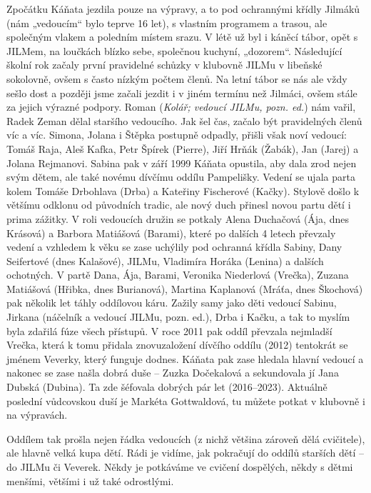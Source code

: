 Zpočátku Káňata jezdila pouze na výpravy, a to pod ochrannými křídly
Jilmáků (nám „vedoucím`` bylo teprve 16 let), s vlastním programem a
trasou, ale společným vlakem a poledním místem srazu. V létě už byl i
káněcí tábor, opět s JILMem, na loučkách blízko sebe, společnou kuchyní,
„dozorem``. Následující školní rok začaly první pravidelné schůzky v
klubovně JILMu v libeňské sokolovně, ovšem s často nízkým počtem členů.
Na letní tábor se nás ale vždy sešlo dost a později jsme začali jezdit i
v jiném termínu než Jilmáci, ovšem stále za jejich výrazné podpory.
Roman (\emph{Kolář; vedoucí JILMu, pozn. ed.}) nám vařil, Radek Zeman
dělal staršího vedoucího. Jak šel čas, začalo být pravidelných členů víc
a víc. Simona, Jolana i Štěpka postupně odpadly, přišli však noví
vedoucí: Tomáš Raja, Aleš Kafka, Petr Špírek (Pierre), Jiří Hrňák
(Žabák), Jan (Jarej) a Jolana Rejmanovi. Sabina pak v září 1999 Káňata
opustila, aby dala zrod nejen svým dětem, ale také novému dívčímu oddílu
Pampelišky. Vedení se ujala parta kolem Tomáše Drbohlava (Drba) a
Kateřiny Fischerové (Kačky). Stylově došlo k většímu odklonu od
původních tradic, ale nový duch přinesl novou partu dětí i prima
zážitky. V roli vedoucích družin se potkaly Alena Duchačová (Ája, dnes
Krásová) a Barbora Matiášová (Barami), které po dalších 4 letech
převzaly vedení a vzhledem k věku se zase uchýlily pod ochranná křídla
Sabiny, Dany Seifertové (dnes Kalašové), JILMu, Vladimíra Horáka
(Lenina) a dalších ochotných. V partě Dana, Ája, Barami, Veronika
Niederlová (Vrečka), Zuzana Matiášová (Hřibka, dnes Burianová), Martina
Kaplanová (Mráťa, dnes Škochová) pak několik let táhly oddílovou káru.
Zažily samy jako děti vedoucí Sabinu, Jirkana (náčelník a vedoucí JILMu,
pozn. ed.), Drba i Kačku, a tak to myslím byla zdařilá fúze všech
přístupů. V roce 2011 pak oddíl převzala nejmladší Vrečka, která k tomu
přidala znovuzaložení dívčího oddílu (2012) tentokrát se jménem Veverky,
který funguje dodnes. Káňata pak zase hledala hlavní vedoucí a nakonec
se zase našla dobrá duše -- Zuzka Dočekalová a sekundovala jí Jana
Dubská (Dubina). Ta zde šéfovala dobrých pár let (2016--2023). Aktuálně
poslední vůdcovskou duší je Markéta Gottwaldová, tu můžete potkat v
klubovně i na výpravách.

Oddílem tak prošla nejen řádka vedoucích (z nichž většina zároveň dělá
cvičitele), ale hlavně velká kupa dětí. Rádi je vidíme, jak pokračují do
oddílů starších dětí -- do JILMu či Veverek. Někdy je potkáváme ve
cvičení dospělých, někdy s dětmi menšími, většími i už také odrostlými.

